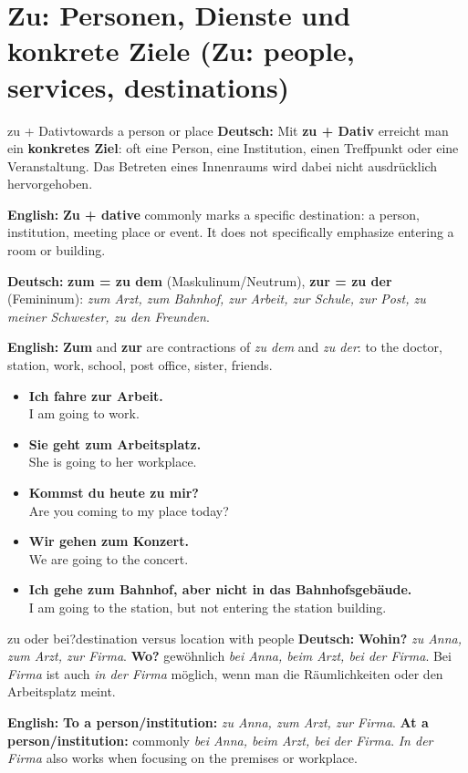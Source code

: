 \documentclass[a4paper,11pt]{article}
\newcommand{\GermanText}[1]{\textbf{Deutsch: }#1\par}
\newcommand{\EnglishText}[1]{{\small\color{SoftGray}\textbf{English: }#1\par}}
\newcommand{\ExampleItem}[2]{\item \textbf{#1}\\{\small\color{SoftGray}#2}}
\begin{document}
\section{Zu: Personen, Dienste und konkrete Ziele (Zu: people, services, destinations)}
\begin{grammarentry}{zu + Dativ}{towards a person or place}
\GermanText{Mit \textbf{zu + Dativ} erreicht man ein \textbf{konkretes Ziel}: oft eine Person, eine Institution, einen Treffpunkt oder eine Veranstaltung. Das Betreten eines Innenraums wird dabei nicht ausdrücklich hervorgehoben.}
\EnglishText{\textbf{Zu + dative} commonly marks a specific destination: a person, institution, meeting place or event. It does not specifically emphasize entering a room or building.}
\GermanText{\textbf{zum = zu dem} (Maskulinum/Neutrum), \textbf{zur = zu der} (Femininum): \emph{zum Arzt, zum Bahnhof, zur Arbeit, zur Schule, zur Post, zu meiner Schwester, zu den Freunden}.}
\EnglishText{\textbf{Zum} and \textbf{zur} are contractions of \emph{zu dem} and \emph{zu der}: to the doctor, station, work, school, post office, sister, friends.}
\end{grammarentry}
\begin{exbox}\begin{itemize}
\ExampleItem{Ich fahre zur Arbeit.}{I am going to work.}
\ExampleItem{Sie geht zum Arbeitsplatz.}{She is going to her workplace.}
\ExampleItem{Kommst du heute zu mir?}{Are you coming to my place today?}
\ExampleItem{Wir gehen zum Konzert.}{We are going to the concert.}
\ExampleItem{Ich gehe zum Bahnhof, aber nicht in das Bahnhofsgebäude.}{I am going to the station, but not entering the station building.}
\end{itemize}\end{exbox}
\begin{grammarentry}{zu oder bei?}{destination versus location with people}
\GermanText{\textbf{Wohin?} \emph{zu Anna, zum Arzt, zur Firma}. \textbf{Wo?} gewöhnlich \emph{bei Anna, beim Arzt, bei der Firma}. Bei \emph{Firma} ist auch \emph{in der Firma} möglich, wenn man die Räumlichkeiten oder den Arbeitsplatz meint.}
\EnglishText{\textbf{To a person/institution:} \emph{zu Anna, zum Arzt, zur Firma}. \textbf{At a person/institution:} commonly \emph{bei Anna, beim Arzt, bei der Firma}. \emph{In der Firma} also works when focusing on the premises or workplace.}
\end{grammarentry}
\end{document}
